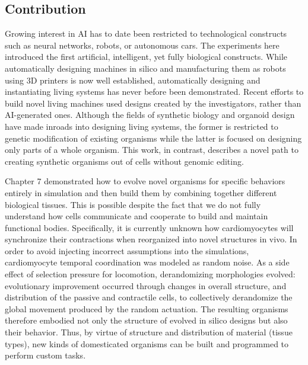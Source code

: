 \subsection{Contribution}

Growing interest in AI has to date been restricted to technological constructs such as neural networks, robots, or autonomous cars. 
The experiments here
introduced the first artificial, intelligent, yet fully biological constructs. 
While automatically designing machines in silico and manufacturing them as robots using 3D printers is now well established, automatically designing and instantiating living systems has never before been demonstrated. 
Recent efforts to build novel living machines \cite{herr2004swimming,xi2005self,feinberg2007muscular,cvetkovic2014three,raman2016optogenetic,nawroth2012tissue,park2016phototactic,ricotti2017biohybrid} used designs created by the investigators, rather than AI-generated ones.
Although the fields of synthetic biology and organoid design have made inroads into designing living systems, the former is restricted to genetic modification of existing organisms while the latter is focused on designing only parts of a whole organism.
This work, in contrast, describes a novel path to creating synthetic organisms out of cells without genomic editing.

Chapter 7 demonstrated how to evolve novel organisms for specific behaviors entirely in simulation and then build them 
by combining together different biological tissues.
This is possible despite the fact that we do not fully understand how cells communicate and cooperate to build and maintain functional bodies.
Specifically,
it is currently unknown how cardiomyocytes will synchronize their contractions when reorganized into novel structures in vivo.
In order to avoid injecting incorrect assumptions into the simulations,
cardiomyocyte temporal coordination was modeled as random noise.
As a side effect of selection pressure for locomotion, derandomizing morphologies evolved: evolutionary improvement occurred through changes in overall structure, and distribution of the passive and contractile cells, to collectively derandomize the global movement produced by the random actuation. 
The resulting organisms therefore embodied not only the structure of evolved in silico designs but also their behavior.
Thus, by virtue of structure and distribution of material (tissue types), new kinds of domesticated organisms can be built and programmed to perform custom tasks.



